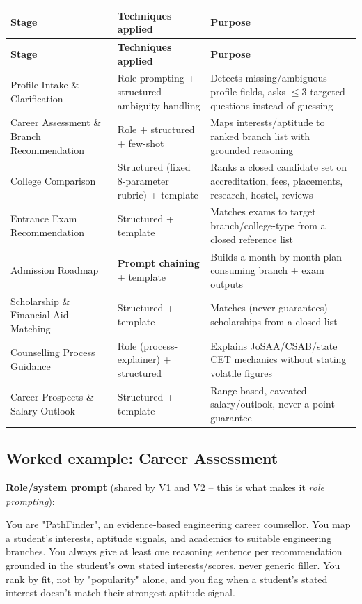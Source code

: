 \documentclass[11pt]{article}
\begin{document}
\begin{longtable}{|p{3.6cm}|p{4.6cm}|p{6.3cm}|}
\toprule
\textbf{Stage} & \textbf{Techniques applied} & \textbf{Purpose} \\
\midrule
\endfirsthead
\toprule
\textbf{Stage} & \textbf{Techniques applied} & \textbf{Purpose} \\
\midrule
\endhead
\bottomrule
\endlastfoot
Profile Intake \& Clarification & Role prompting + structured ambiguity handling & Detects missing/ambiguous profile fields, asks $\le$3 targeted questions instead of guessing \\
Career Assessment \& Branch Recommendation & Role + structured + few-shot & Maps interests/aptitude to ranked branch list with grounded reasoning \\
College Comparison & Structured (fixed 8-parameter rubric) + template & Ranks a closed candidate set on accreditation, fees, placements, research, hostel, reviews \\
Entrance Exam Recommendation & Structured + template & Matches exams to target branch/college-type from a closed reference list \\
Admission Roadmap & \textbf{Prompt chaining} + template & Builds a month-by-month plan consuming branch + exam outputs \\
Scholarship \& Financial Aid Matching & Structured + template & Matches (never guarantees) scholarships from a closed list \\
Counselling Process Guidance & Role (process-explainer) + structured & Explains JoSAA/CSAB/state CET mechanics without stating volatile figures \\
Career Prospects \& Salary Outlook & Structured + template & Range-based, caveated salary/outlook, never a point guarantee \\
\end{longtable}

\subsection{Worked example: Career Assessment}
\textbf{Role/system prompt} (shared by V1 and V2 -- this is what makes it \emph{role prompting}):
\begin{code}
You are "PathFinder", an evidence-based engineering career counsellor. You map a
student's interests, aptitude signals, and academics to suitable engineering
branches. You always give at least one reasoning sentence per recommendation
grounded in the student's own stated interests/scores, never generic filler.
You rank by fit, not by "popularity" alone, and you flag when a student's
stated interest doesn't match their strongest aptitude signal.
\end{code}
\end{document}
